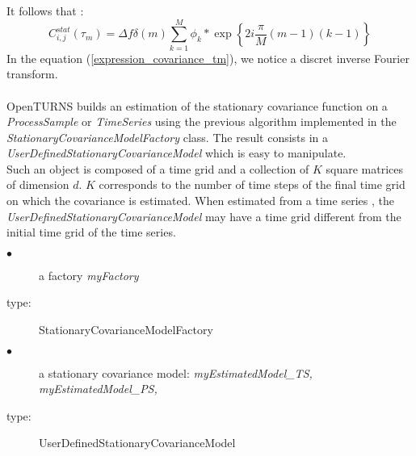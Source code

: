 It follows that :
\begin{equation}\label{expression_covariance_tm}
  C_{i,j}^{stat}(\tau_m)  = \Delta f \delta(m) \sum_{k=1}^{M} \phi_k * \exp\left\{2i \frac{\pi}{M} (m-1)(k-1)  \right\}
\end{equation}
In the equation (\ref{expression_covariance_tm}), we notice a discret inverse Fourier transform.\\ \\
OpenTURNS builds an estimation of the stationary covariance function on a \textit{ProcessSample} or \textit{TimeSeries} using the previous algorithm implemented in the \textit{StationaryCovarianceModelFactory} class. The result consists in a \textit{UserDefinedStationaryCovarianceModel} which is easy to manipulate. \\
Such an object is composed of a time grid and a collection of $K$ square matrices of dimension $d$. $K$ corresponds to the number of time steps of the final time grid on which the covariance is estimated.
When estimated from a time series , the \textit{UserDefinedStationaryCovarianceModel} may have a  time grid different from the initial time grid of the time series.\\



{
  \begin{description}
  \item[$\bullet$] a factory {\itshape myFactory}
  \item[type:]  StationaryCovarianceModelFactory
  \end{description}

  \begin{description}
  \item[$\bullet$] a stationary covariance model: {\itshape myEstimatedModel\_TS, myEstimatedModel\_PS,}
  \item[type:]  UserDefinedStationaryCovarianceModel
  \end{description}
}

